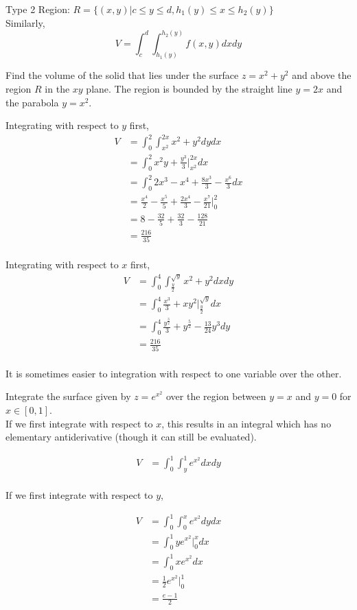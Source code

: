 \documentclass[12pt]{article}
\begin{document}
Type 2 Region: $R = \{(x,y)| c \leq y \leq d, h_1(y) \leq x \leq h_2(y)\}$ \\
Similarly,
$$V = \int_c^d \int_{h_1(y)}^{h_2(y)} f(x,y) dxdy$$

\begin{ex}
 Find the volume of the solid that lies under the surface $z = x^2 + y^2$ and above the region $R$ in the $xy$ plane. The region is bounded by the straight line $y = 2x$ and the parabola $y = x^2$.
 
 Integrating with respect to $y$ first,
\begin{align*}
 V &= \int_0^2 \int_{x^2}^{2x} x^2 + y^2 dydx \\
 &= \int_0^2 x^2y + \frac{y^3}{3} \Big |_{x^2}^{2x} dx \\
 &= \int_0^2 2x^3 - x^4 + \frac{8x^3}{3} - \frac{x^6}{3} dx \\
 &= \frac{x^4}{2} - \frac{x^5}{5} + \frac{2x^4}{3} - \frac{x^7}{21} \Big |_0^2 \\
 &= 8 - \frac{32}{5} + \frac{32}{3} - \frac{128}{21} \\
 &= \frac{216}{35} \\
\end{align*}

Integrating with respect to $x$ first,
\begin{align*}
 V &= \int_0^4 \int_{\frac{y}{2}}^{\sqrt{y}} x^2 + y^2 dxdy \\
 &= \int_0^4 \frac{x^3}{3} + xy^2 \Big |_{\frac{y}{2}}^{\sqrt{y}} dx \\
 &= \int_0^4 \frac{y^{\frac{3}{2}}}{3} + y^{\frac{5}{2}} - \frac{13}{24} y^3 dy \\
 &= \frac{216}{35} \\
\end{align*}
\end{ex}

It is sometimes easier to integration with respect to one variable over the other. 

\begin{ex}
 Integrate the surface given by $z = e^{x^2}$ over the region between $y = x$ and $y = 0$ for $x \in [0,1]$. \\
 
 If we first integrate with respect to $x$, this results in an integral which has no elementary antiderivative (though it can still be evaluated).
 
\begin{align*}
 V &= \int_0^1\int_y^1 e^{x^2}dx dy \\
\end{align*}

If we first integrate with respect to $y$,

\begin{align*}
 V &= \int_0^1 \int_0^x e^{x^2} dydx \\
 &= \int_0^1 ye^{x^2} \Big |_0^x dx \\
 &= \int_0^1 xe^{x^2} dx \\
 &= \frac{1}{2} e^{x^2} \Big |_0^1 \\
 &= \frac{e - 1}{2} \\
\end{align*}
\end{ex}
\end{document}
